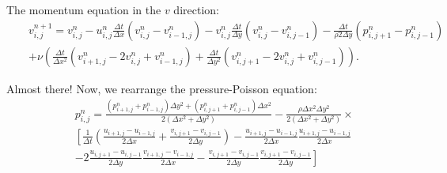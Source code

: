 \documentclass[11pt, sans]{amsart}
\begin{document}
The momentum equation in the $v$ direction:
\begin{eqnarray}
&& v_{i,j}^{n+1} = v_{i,j}^{n}-u_{i,j}^{n}\frac{\Delta t}{\Delta x}(v_{i,j}^{n}-v_{i-1,j}^{n})
    - v_{i,j}^{n}\frac{\Delta t}{\Delta y}(v_{i,j}^{n}-v_{i,j-1}^{n})-\frac{\Delta t}{\rho 2\Delta y}(p_{i,j+1}^{n}-p_{i,j-1}^{n}) \\
   && +\nu\left(\frac{\Delta t}{\Delta x^2}(v_{i+1,j}^{n}-2v_{i,j}^{n}+v_{i-1,j}^{n})\right.
    +\left.\frac{\Delta t}{\Delta y^2}(v_{i,j+1}^{n}-2v_{i,j}^{n}+v_{i,j-1}^{n})\right).
\end{eqnarray}

Almost there! Now, we rearrange the pressure-Poisson equation:
\begin{eqnarray}
&& p_{i,j}^{n}=\frac{(p_{i+1,j}^{n}+p_{i-1,j}^{n})\Delta y^2+(p_{i,j+1}^{n}+p_{i,j-1}^{n})\Delta x^2}{2(\Delta x^2+\Delta y^2)}-\frac{\rho\Delta x^2\Delta y^2}{2(\Delta x^2+\Delta y^2)} \times \\
&& \left[\frac{1}{\Delta t}\left(\frac{u_{i+1,j}-u_{i-1,j}}{2\Delta x}+\frac{v_{i,j+1}-v_{i,j-1}}{2\Delta y}\right)-\frac{u_{i+1,j}-u_{i-1,j}}{2\Delta x}\frac{u_{i+1,j}-u_{i-1,j}}{2\Delta x}\right. \\
&& -2\frac{u_{i,j+1}-u_{i,j-1}}{2\Delta y}\frac{v_{i+1,j}-v_{i-1,j}}{2\Delta x}-\left.\frac{v_{i,j+1}-v_{i,j-1}}{2\Delta y}\frac{v_{i,j+1}-v_{i,j-1}}{2\Delta y}\right]
\end{eqnarray}
\end{document}
